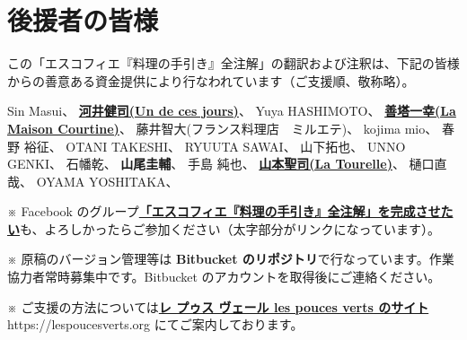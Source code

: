 \hypertarget{benefactors}{%
\section{後援者の皆様}\label{benefactors}}

\thispagestyle{empty}

\small

この「エスコフィエ『料理の手引き』全注解」の翻訳および注釈は、下記の皆様からの善意ある資金提供により行なわれています（ご支援順、敬称略）。

\normalsize
\vspace{1\zw}

Sin Masui、\href{20180524-23h,2x,novelsoundsmail@gmail.com}{}
\href{http://www.undecesjours.com/}{\textbf{河井健司(Un de ces
jours)}}、\href{20180525-0h14,10x,20180605-11h42,10x,kwibeng@gmail.com}{}
Yuya HASHIMOTO、\href{20180525-1h40,2x,hashimo0910@gmail.com}{}
\href{http://www.courtine.jp/}{\textbf{善塔一幸(La Maison
Courtine)}}、\href{20180525-8h56,10x,kazuyukizento120@docomo.ne.jp}{}
藤井智大(フランス料理店　ミルエテ)、\href{20180525-10h07,1x,apple19761019@yahoo.co.jp}{}
kojima mio、\href{20180525-12h23,1x,teeeeshow@yahoo.co.jp}{} 春野
裕征、\href{20180528-2h41,20180617,2x,amanojack.v-o-v@i.softbank.jp}{}
OTANI TAKESHI、\href{20180529-17h26,2x,1000feuille@ezweb.ne.jp}{} RYUUTA
SAWAI、\href{20180530-2h57.1x,rs.ajtk.zz@i.softbank.jp}{}
山下拓也、\href{20180605-11h04,5x,FB:Takuya\%20Yamashita}{} UNNO
GENKI、\href{20180605-22h12,1x,guriiva@aol.com}{}
石幡乾、\href{201806060-6h24,1x,zonek.gentile.bonheur.ken05@gmail.com}{}
\textbf{山尾圭輔}、\href{20180612-10h27,20x,yamaokeisuke@hotmail.com}{}
手島 純也、\href{20180612-19h19,1x,junchef1975@yahoo.co.jp}{}
\href{http://www.tourelle.jp/}{\textbf{山本聖司(La
Tourelle)}}、\href{20180622,10x,tourelle@tourelle.jp}{}
樋口直哉、\href{20180622-10h58,1x}{} OYAMA
YOSHITAKA、\href{20180622-22h50,x2}{}

\vfill

\small

※ Facebook
のグループ\href{https://www.facebook.com/groups/1548833425201180/}{\textbf{「エスコフィエ『料理の手引き』全注解」を完成させたい}}も、よろしかったらご参加ください（太字部分がリンクになっています）。

※ 原稿のバージョン管理等は \textbf{Bitbucket
のリポジトリ}で行なっています。作業協力者常時募集中です。Bitbucket
のアカウントを取得後にご連絡ください。

※
ご支援の方法については\href{https://lespoucesverts.org/archives/7042}{\textbf{レ
プゥス ヴェール les pouces verts のサイト}} https://lespoucesverts.org
にてご案内しております。

\normalsize
